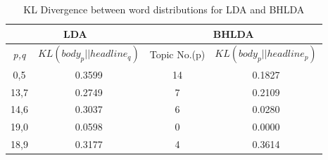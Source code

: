 \documentclass[a4paper]{article}
\begin{document}
\begin{table}[ht] \label{ht}
\caption{KL Divergence between word distributions for LDA and BHLDA}
\centering
\begin{tabular}{c c | c c}
\hline \hline
\multicolumn{2}{c}{LDA} & \multicolumn{2}{c}{BHLDA} \\
\hline
\emph{p,q} & $KL(body_{p}||headline_{q})$ & Topic No.(p) & $KL(body_{p} || headline_{p})$ \\
\hline
0,5 & 0.3599 & 14 & 0.1827 \\
13,7 & 0.2749 & 7 & 0.2109 \\
14,6 & 0.3037 & 6 & 0.0280 \\
19,0 & 0.0598 & 0 & 0.0000 \\
18,9 & 0.3177 & 4 & 0.3614\\
\hline
\end{tabular}
\end{table}
\end{document}
